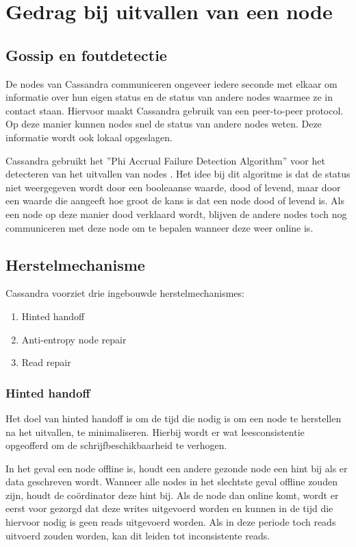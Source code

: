 \chapter{Gedrag bij uitvallen van een node}
\label{ch:cassandra_uitval}

\section{Gossip en foutdetectie}
De nodes van Cassandra communiceren ongeveer iedere seconde met elkaar om informatie over hun eigen status en de status van andere nodes waarmee ze in contact staan.
Hiervoor maakt Cassandra gebruik van een peer-to-peer protocol.
Op deze manier kunnen nodes snel de status van andere nodes weten.
Deze informatie wordt ook lokaal opgeslagen.

Cassandra gebruikt het ''Phi Accrual Failure Detection Algorithm'' voor het detecteren van het uitvallen van nodes \citep{kan2014cassandra}.
Het idee bij dit algoritme is dat de status niet weergegeven wordt door een booleaanse waarde, dood of levend, maar door een waarde die aangeeft hoe groot de kans is dat een node dood of levend is.
Als een node op deze manier dood verklaard wordt, blijven de andere nodes toch nog communiceren met deze node om te bepalen wanneer deze weer online is.

\section{Herstelmechanisme}
Cassandra voorziet drie ingebouwde herstelmechanismes:

\begin{enumerate}
	\item Hinted handoff
	\item Anti-entropy node repair
	\item Read repair
\end{enumerate}

\subsection{Hinted handoff}
Het doel van hinted handoff is om de tijd die nodig is om een node te herstellen na het uitvallen, te minimaliseren.
Hierbij wordt er wat leesconsistentie opgeofferd om de schrijfbeschikbaarheid te verhogen.

In het geval een node offline is, houdt een andere gezonde node een hint bij als er data geschreven wordt.
Wanneer alle nodes in het slechtste geval offline zouden zijn, houdt de coördinator deze hint bij.
Als de node dan online komt, wordt er eerst voor gezorgd dat deze writes uitgevoerd worden en kunnen in de tijd die hiervoor nodig is geen reads uitgevoerd worden.
Als in deze periode toch reads uitvoerd zouden worden, kan dit leiden tot inconsistente reads.

